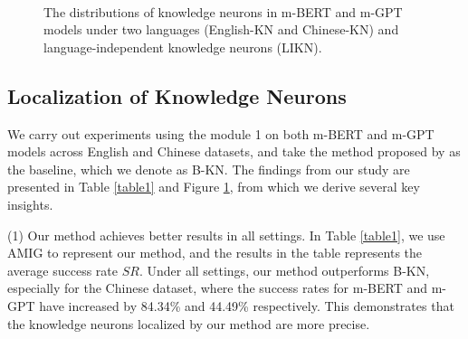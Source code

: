 \documentclass[]{article}
\begin{document}
\begin{figure}
\centering
{}
\\
\caption{The distributions of knowledge neurons in m-BERT and m-GPT models under two languages (English-KN and Chinese-KN) and language-independent knowledge neurons (LIKN).}
\label{fig3}
\end{figure}

\subsection{Localization of Knowledge Neurons}
We carry out experiments using the module 1 on both m-BERT and m-GPT models across English and Chinese datasets, and take the method proposed by \citeauthor{dai2022kn} as the baseline, which we denote as B-KN.
The findings from our study are presented in Table \ref{table1} and Figure \ref{fig3}, from which we derive several key insights.

(1) Our method achieves better results in all settings. In Table \ref{table1}, we use AMIG to represent our method, and the results in the table represents the average success rate \( SR \). Under all settings, our method outperforms B-KN, especially for the Chinese dataset, where the success rates for m-BERT and m-GPT have increased by 84.34\% and 44.49\% respectively. This demonstrates that the knowledge neurons localized by our method are more precise.
\end{document}
